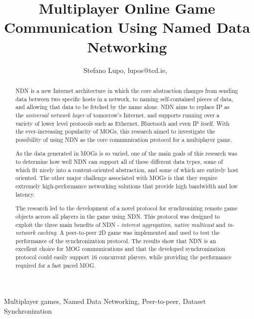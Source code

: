 \documentclass[journal]{IEEEtran}
\author{Stefano Lupo, lupos@tcd.ie,~\IEEEmembership{MAI, Trinity College Dublin}}%
\title{Multiplayer Online Game Communication Using Named Data Networking}
\begin{document}
\maketitle

\begin{abstract}
NDN is a new Internet architecture in which the core abstraction changes from sending data between two specific hosts in a network, to naming self-contained pieces of data, and allowing that data to be fetched by the name alone. NDN aims to replace IP as the \textit{universal network layer} of tomorrow's Internet, and supports running over a variety of lower level protocols such as Ethernet, Bluetooth and even IP itself. With the ever-increasing popularity of MOGs, this research aimed to investigate the possibility of using NDN as the core communication protocol for a multiplayer game.

As the data generated in MOGs is so varied, one of the main goals of this research was to determine how well NDN can support all of these different data types, some of which fit nicely into a content-oriented abstraction, and some of which are entirely host oriented. The other major challenge associated with MOGs is that they require extremely high-performance networking solutions that provide high bandwidth and low latency.

The research led to the development of a novel protocol for synchronizing remote game objects across all players in the game using NDN. This protocol was designed to exploit the three main benefits of NDN - \textit{interest aggregation}, \textit{native multicast} and \textit{in-network caching}. A peer-to-peer 2D game was implemented and used to test the performance of the synchronization protocol. The results show that NDN is an excellent choice for MOG communications and that the developed synchronization protocol could easily support 16 concurrent players, while providing the performance required for a fast paced MOG. 
\end{abstract}

\begin{IEEEkeywords}
    Multiplayer games, Named Data Networking, Peer-to-peer, Dataset Synchronization
\end{IEEEkeywords}

\end{document}
